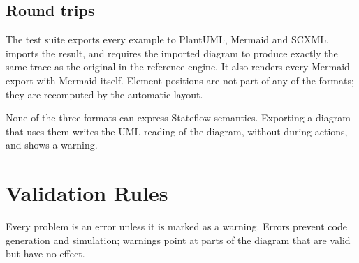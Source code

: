 \documentclass[11pt,a4paper,openany]{report}
\begin{document}
\section{Round trips}
The test suite exports every example to PlantUML, Mermaid and SCXML, imports the result, and requires
the imported diagram to produce exactly the same trace as the original in the reference engine. It also
renders every Mermaid export with Mermaid itself. Element positions are not part of any of the formats;
they are recomputed by the automatic layout.

None of the three formats can express Stateflow semantics. Exporting a diagram that uses them writes the
UML reading of the diagram, without during actions, and shows a warning.

\chapter{Validation Rules}
\label{ch:rules}

Every problem is an error unless it is marked as a warning. Errors prevent code generation and
simulation; warnings point at parts of the diagram that are valid but have no effect.
\end{document}
